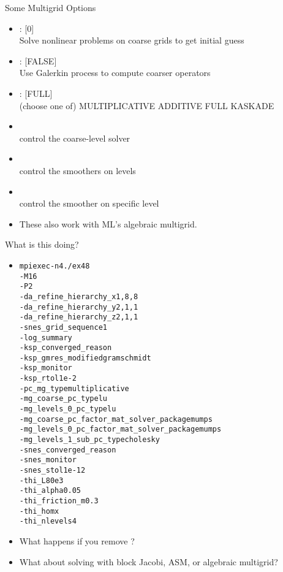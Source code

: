 


\begin{frame}{Some Multigrid Options}
  \begin{itemize}
  \item {}: [0] \\
    Solve nonlinear problems on coarse grids to get initial guess
  \item {}: [FALSE] \\
    Use Galerkin process to compute coarser operators
  \item {}: [FULL] \\
    (choose one of) MULTIPLICATIVE ADDITIVE FULL KASKADE
  \item {} \\
    control the coarse-level solver
  \item {} \\
    control the smoothers on levels
  \item {} \\
    control the smoother on specific level
  \item These also work with ML's algebraic multigrid.
  \end{itemize}
\end{frame}

\begin{frame}{What is this doing?}
\begin{itemize}
\item
\begin{alltt}\footnotesize
mpiexec -n 4 ./ex48
-M 16
-P 2
-da\_refine\_hierarchy\_x 1,8,8 \\
-da\_refine\_hierarchy\_y 2,1,1
-da\_refine\_hierarchy\_z 2,1,1 \\
-snes\_grid\_sequence 1
-log\_summary \\
-ksp\_converged\_reason
-ksp\_gmres\_modifiedgramschmidt \\
-ksp\_monitor
-ksp\_rtol 1e-2 \\
-pc\_mg\_type multiplicative \\
-mg\_coarse\_pc\_type lu
-mg\_levels\_0\_pc\_type lu \\
-mg\_coarse\_pc\_factor\_mat\_solver\_package mumps \\
-mg\_levels\_0\_pc\_factor\_mat\_solver\_package mumps \\
-mg\_levels\_1\_sub\_pc\_type cholesky \\
-snes\_converged\_reason
-snes\_monitor
-snes\_stol 1e-12 \\
-thi\_L 80e3
-thi\_alpha 0.05
-thi\_friction\_m 0.3 \\
-thi\_hom x
-thi\_nlevels 4
\end{alltt}
\item What happens if you remove ?
\item What about solving with block Jacobi, ASM, or algebraic multigrid?
\end{itemize}
\end{frame}
